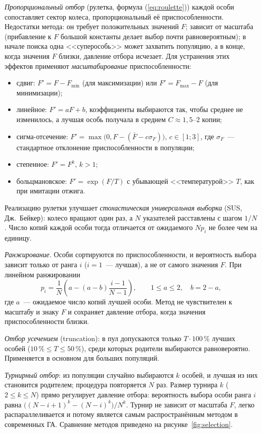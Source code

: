 \emph{Пропорциональный отбор} (рулетка, формула (\ref{eq:roulette})) каждой особи сопоставляет сектор
колеса, пропорциональный её приспособленности. Недостатки метода: он требует положительных значений
$F$; зависит от масштаба (прибавление к $F$ большой константы делает выбор почти равновероятным); в
начале поиска одна <<суперособь>> может захватить популяцию, а в конце, когда значения $F$ близки,
давление отбора исчезает. Для устранения этих эффектов применяют \emph{масштабирование}
приспособленности:
\begin{itemize}
\item сдвиг: $F' = F - F_{\min}$ (для максимизации) или $F' = F_{\max} - F$ (для минимизации);
\item линейное: $F' = aF + b$, коэффициенты выбираются так, чтобы среднее не изменилось, а лучшая
особь получала в среднем $C \approx 1,5$--$2$ копии;
\item сигма-отсечение: $F' = \max\bigl(0, F - (\bar F - c\sigma_F)\bigr)$, $c \in [1; 3]$, где
$\sigma_F$~--- стандартное отклонение приспособленности в популяции;
\item степенное: $F' = F^k$, $k > 1$;
\item больцмановское: $F' = \exp(F/T)$ с убывающей <<температурой>> $T$, как при имитации отжига.
\end{itemize}
Реализацию рулетки улучшает \emph{стохастическая универсальная выборка} (SUS, Дж.~Бейкер): колесо
вращают один раз, а $N$ указателей расставлены с шагом $1/N$. Число копий каждой особи тогда
отличается от ожидаемого $Np_i$ не более чем на единицу.

\emph{Ранжирование.} Особи сортируются по приспособленности, и вероятность выбора зависит только от
ранга $i$ ($i = 1$~--- лучшая), а не от самого значения $F$. При линейном ранжировании
\begin{equation}
\label{eq:rank}
p_i = \frac{1}{N}\left(a - (a - b)\frac{i - 1}{N - 1}\right), \qquad 1 \le a \le 2, \quad b = 2 - a,
\end{equation}
где $a$~--- ожидаемое число копий лучшей особи. Метод не чувствителен к масштабу и знаку $F$ и сохраняет
давление отбора, когда значения приспособленности близки.

\emph{Отбор усечением} (truncation): в пул допускаются только $T\cdot 100\,\%$ лучших особей
($10\,\% \le T \le 50\,\%$), среди которых родители выбираются равновероятно. Применяется в основном
для больших популяций.

\emph{Турнирный отбор}: из популяции случайно выбираются $k$ особей, и лучшая из них становится
родителем; процедура повторяется $N$ раз. Размер турнира $k$ ($2 \le k \le N$) прямо регулирует
давление отбора: вероятность выбора особи ранга $i$ равна
$\bigl((N - i + 1)^k - (N - i)^k\bigr)/N^k$. Турнир не зависит от масштаба $F$, легко распараллеливается
и потому является самым распространённым методом в современных ГА. Сравнение методов приведено на
рисунке~\ref{fig:selection}.

